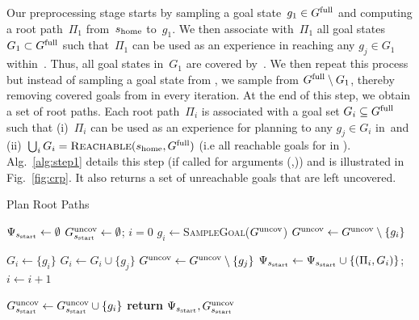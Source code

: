 \documentclass[conference]{IEEEtran}
\begin{document}
Our preprocessing stage starts by sampling a goal state~$g_1 \in G^{\textrm{full}}$ and computing a root path~$\Pi_1$ from~$s_{\textrm{home}}$ to~$g_1$. We then associate with~$\Pi_1$ all goal states~$G_1 \subset G^{\textrm{full}}$ such that~$\Pi_1$ can be used as an experience in reaching any $g_j \in G_1$ within~\Tbound.
Thus, all goal states in~$G_1$ are covered by~\Shome.
%
We then repeat this process but instead of sampling  a goal state from \Gfull, we sample from $G^{\textrm{full}} \setminus G_1$, thereby removing covered goals from \Gfull in every iteration.
At the end of this step, we obtain a set of root paths. 
Each root path~$\Pi_i$ is associated with a goal set $G_i \subseteq G^{\textrm{full}}$ such that 
(i)~$\Pi_i$ can be used as an experience for planning to any $g_j \in G_i$ in~\Tbound and 
(ii)~$\bigcup_i G_i = \textsc{Reachable}(s_{\textrm{home}}, G^{\textrm{full}})$ (i.e all reachable goals for \Shome in \Gfull).
%
Alg.~\ref{alg:step1} details this step (if called for arguments (\Shome,\Gfull)) and is illustrated in Fig.~\ref{fig:crp}. It also returns a set of unreachable goals that are left uncovered.




\begin{algorithm}[t]
\caption{Plan Root Paths}
\label{alg:step1}
    \AlgFontSize
\begin{algorithmic}[1]
\State $\Psi_{s_{\textrm{start}}} \leftarrow \emptyset$   
\State $G^{\textrm{uncov}}_{s_{\textrm{start}}} \leftarrow \emptyset$; \hspace{3mm}
       $i = 0$
\While{$\Guncov \neq \emptyset$}
    \State $g_i \leftarrow$\textsc{SampleGoal}($G^{\textrm{uncov}}$)
    \State $G^{\textrm{uncov}} \leftarrow G^{\textrm{uncov}} \setminus \{g_i\}$
    
     
        \State $G_i \leftarrow \{ g_i \}$   
                \State $G_i \leftarrow G_i \cup \{g_j\}$
                \State $G^{\textrm{uncov}} \leftarrow G^{\textrm{uncov}} \setminus \{g_j\}$
            \EndIf
        \EndFor
        \State $\Psi_{s_{\textrm{start}}} \leftarrow \Psi_{s_{\textrm{start}}} \cup \{ (\Pi_i, G_i)\}$; \hspace{3mm}
        $i \leftarrow i + 1$
        
    \Else
        \State $G^{\textrm{uncov}}_{s_{\textrm{start}}} \leftarrow G^{\textrm{uncov}}_{s_{\textrm{start}}} \cup \{g_i\}$ 
    \EndIf
\EndWhile
\State \textbf{return} $\Psi_{s_{\textrm{start}}}, G^{\textrm{uncov}}_{s_{\textrm{start}}}$
\EndProcedure
\end{algorithmic}
\end{algorithm}
\end{document}
